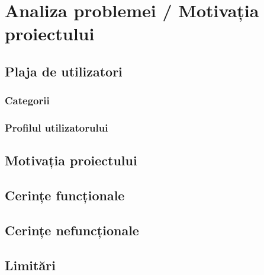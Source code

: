 \chapter{Analiza problemei / Motivația proiectului}
\label{chapter:analiza}

\section{Plaja de utilizatori}
\label{sec:proj}

\subsection{Categorii}
\label{sub-sec:proj-scope}

\subsection{Profilul utilizatorului}
\label{sub-sec:proj-user-profile}

\section{Motivația proiectului}
\label{sec:proj-motivation}

\section{Cerințe funcționale}
\label{sec:proj-requirements}

\section{Cerințe nefuncționale}
\label{sec:proj-non-functional-requirements}

\section{Limitări}
\label{sec:proj-limitations}
